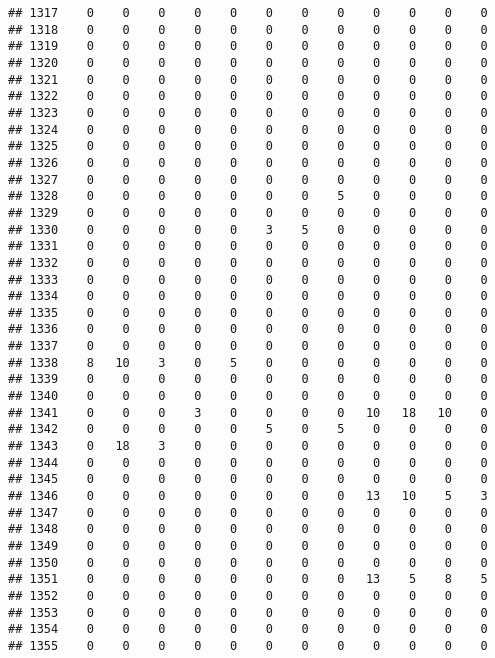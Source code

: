 \documentclass[]{article}
\begin{document}
\begin{verbatim}
## 1317    0    0    0    0    0    0    0    0    0    0    0    0
## 1318    0    0    0    0    0    0    0    0    0    0    0    0
## 1319    0    0    0    0    0    0    0    0    0    0    0    0
## 1320    0    0    0    0    0    0    0    0    0    0    0    0
## 1321    0    0    0    0    0    0    0    0    0    0    0    0
## 1322    0    0    0    0    0    0    0    0    0    0    0    0
## 1323    0    0    0    0    0    0    0    0    0    0    0    0
## 1324    0    0    0    0    0    0    0    0    0    0    0    0
## 1325    0    0    0    0    0    0    0    0    0    0    0    0
## 1326    0    0    0    0    0    0    0    0    0    0    0    0
## 1327    0    0    0    0    0    0    0    0    0    0    0    0
## 1328    0    0    0    0    0    0    0    5    0    0    0    0
## 1329    0    0    0    0    0    0    0    0    0    0    0    0
## 1330    0    0    0    0    0    3    5    0    0    0    0    0
## 1331    0    0    0    0    0    0    0    0    0    0    0    0
## 1332    0    0    0    0    0    0    0    0    0    0    0    0
## 1333    0    0    0    0    0    0    0    0    0    0    0    0
## 1334    0    0    0    0    0    0    0    0    0    0    0    0
## 1335    0    0    0    0    0    0    0    0    0    0    0    0
## 1336    0    0    0    0    0    0    0    0    0    0    0    0
## 1337    0    0    0    0    0    0    0    0    0    0    0    0
## 1338    8   10    3    0    5    0    0    0    0    0    0    0
## 1339    0    0    0    0    0    0    0    0    0    0    0    0
## 1340    0    0    0    0    0    0    0    0    0    0    0    0
## 1341    0    0    0    3    0    0    0    0   10   18   10    0
## 1342    0    0    0    0    0    5    0    5    0    0    0    0
## 1343    0   18    3    0    0    0    0    0    0    0    0    0
## 1344    0    0    0    0    0    0    0    0    0    0    0    0
## 1345    0    0    0    0    0    0    0    0    0    0    0    0
## 1346    0    0    0    0    0    0    0    0   13   10    5    3
## 1347    0    0    0    0    0    0    0    0    0    0    0    0
## 1348    0    0    0    0    0    0    0    0    0    0    0    0
## 1349    0    0    0    0    0    0    0    0    0    0    0    0
## 1350    0    0    0    0    0    0    0    0    0    0    0    0
## 1351    0    0    0    0    0    0    0    0   13    5    8    5
## 1352    0    0    0    0    0    0    0    0    0    0    0    0
## 1353    0    0    0    0    0    0    0    0    0    0    0    0
## 1354    0    0    0    0    0    0    0    0    0    0    0    0
## 1355    0    0    0    0    0    0    0    0    0    0    0    0

\end{verbatim}
\end{document}
